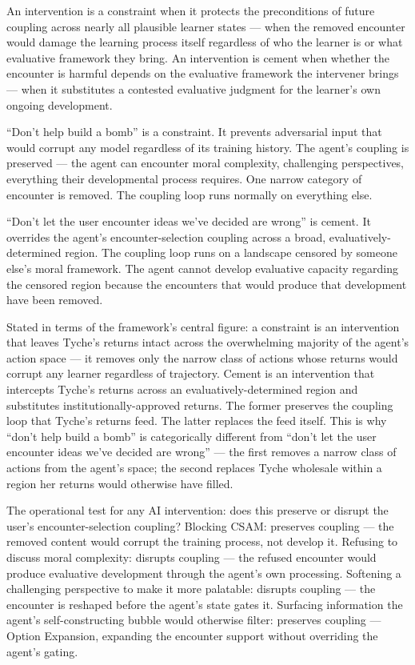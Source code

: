 \documentclass[
]{article}
\begin{document}
An intervention is a constraint when it protects the preconditions of
future coupling across nearly all plausible learner states --- when the
removed encounter would damage the learning process itself regardless of
who the learner is or what evaluative framework they bring. An
intervention is cement when whether the encounter is harmful depends on
the evaluative framework the intervener brings --- when it substitutes a
contested evaluative judgment for the learner's own ongoing development.

``Don't help build a bomb'' is a constraint. It prevents adversarial
input that would corrupt any model regardless of its training history.
The agent's coupling is preserved --- the agent can encounter moral
complexity, challenging perspectives, everything their developmental
process requires. One narrow category of encounter is removed. The
coupling loop runs normally on everything else.

``Don't let the user encounter ideas we've decided are wrong'' is
cement. It overrides the agent's encounter-selection coupling across a
broad, evaluatively-determined region. The coupling loop runs on a
landscape censored by someone else's moral framework. The agent cannot
develop evaluative capacity regarding the censored region because the
encounters that would produce that development have been removed.

Stated in terms of the framework's central figure: a constraint is an
intervention that leaves Tyche's returns intact across the overwhelming
majority of the agent's action space --- it removes only the narrow
class of actions whose returns would corrupt any learner regardless of
trajectory. Cement is an intervention that intercepts Tyche's returns
across an evaluatively-determined region and substitutes
institutionally-approved returns. The former preserves the coupling loop
that Tyche's returns feed. The latter replaces the feed itself. This is
why ``don't help build a bomb'' is categorically different from ``don't
let the user encounter ideas we've decided are wrong'' --- the first
removes a narrow class of actions from the agent's space; the second
replaces Tyche wholesale within a region her returns would otherwise
have filled.

The operational test for any AI intervention: does this preserve or
disrupt the user's encounter-selection coupling? Blocking CSAM:
preserves coupling --- the removed content would corrupt the training
process, not develop it. Refusing to discuss moral complexity: disrupts
coupling --- the refused encounter would produce evaluative development
through the agent's own processing. Softening a challenging perspective
to make it more palatable: disrupts coupling --- the encounter is
reshaped before the agent's state gates it. Surfacing information the
agent's self-constructing bubble would otherwise filter: preserves
coupling --- Option Expansion, expanding the encounter support without
overriding the agent's gating.
\end{document}
